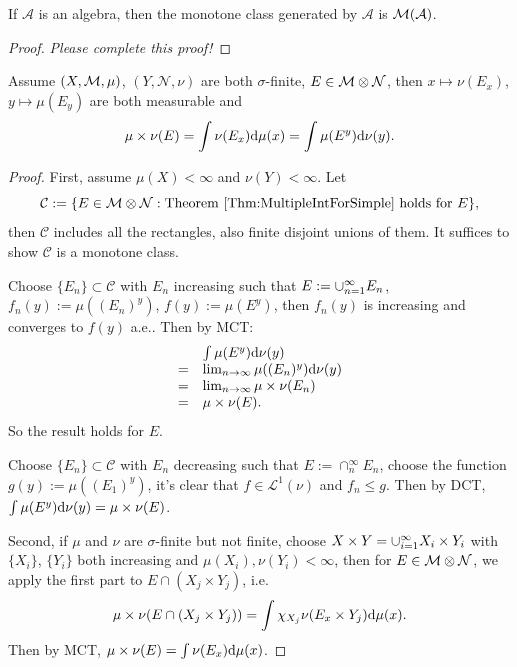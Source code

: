 \begin{lem}
    \label{Lem:MonotoneClassLemma}
    If $\mathcal{A}$ is an algebra, then the monotone class 
    generated by $\mathcal{A}$ is $\mathcal{M}(\mathcal{A})$.
\end{lem}
\begin{proof}
    \textit{Please complete this proof!}
\end{proof}
\begin{thm}
    \label{Thm:MultipleIntForSimple}
    Assume $(X,\mathcal{M},\mu)$, $(Y,\mathcal{N},\nu)$ are both $\sigma$-finite, 
    $E\in\mathcal{M}\otimes\mathcal{N}$, then $x\mapsto\nu(E_x)$, 
    $y\mapsto\mu(E_y)$ are both measurable and 
    \begin{displaymath}
        \mu\times\nu(E)=\int\nu(E_x)\mathrm{d}\mu(x)=\int\mu(E^{y})\mathrm{d}\nu(y).
    \end{displaymath}
\end{thm}
\begin{proof}
    First, assume $\mu(X)<\infty$ and 
    $\nu(Y)<\infty$. Let 
    \begin{displaymath}
        \mathcal{C}:=\{E\in\mathcal{M}\otimes\mathcal{N}:
        \text{Theorem \ref{Thm:MultipleIntForSimple} holds for }E\},
    \end{displaymath}
    then $\mathcal{C}$ includes all the rectangles, also finite disjoint 
    unions of them. It suffices to show $\mathcal{C}$ is a monotone 
    class. 

    Choose $\{E_{n}\}\subset\mathcal{C}$ with $E_{n}$ increasing 
    such that $E:=\cup_{n=1}^{\infty}E_{n}$, $f_{n}(y):=\mu((E_{n})^{y})$, 
    $f(y):=\mu(E^{y})$, then $f_{n}(y)$ is increasing and converges 
    to $f(y)$ a.e.. Then by MCT:
    \begin{displaymath}
        \begin{array}{rl}
        &\int\mu(E^{y})\mathrm{d}\nu(y)\\
        =&\lim_{n\rightarrow\infty}
        \mu((E_{n})^{y})\mathrm{d}\nu(y)\\
        =&\lim_{n\rightarrow\infty}\mu\times\nu(E_{n})\\
        =&\mu\times\nu(E).
        \end{array}
    \end{displaymath}
    So the result holds for $E$. 
    
    Choose $\{E_{n}\}\subset\mathcal{C}$ with $E_{n}$ decreasing 
    such that $E:=\cap_{n}^{\infty}E_{n}$, choose the 
    function $g(y):=\mu((E_{1})^{y})$, it's clear that 
    $f\in\mathcal{L}^{1}(\nu)$ and $f_{n}\le g$. Then by DCT, 
    $\int\mu(E^{y})\mathrm{d}\nu(y)=\mu\times\nu(E)$.

    Second, if $\mu$ and $\nu$ are $\sigma$-finite but not finite, 
    choose $X\times Y=\cup_{i=1}^{\infty}X_{i}\times Y_{i}$ 
    with $\{X_{i}\}$, $\{Y_{i}\}$ both increasing and 
    $\mu(X_{i}),\nu(Y_{i})<\infty$, then for $E\in\mathcal{M}\otimes\mathcal{N}$, 
    we apply the first part to $E\cap (X_{j}\times Y_{j})$, 
    i.e. 
    \begin{displaymath}
        \mu\times\nu(E\cap(X_{j}\times Y_{j}))
        =\int\chi_{X_{j}}\nu(E_{x}\times Y_{j})\mathrm{d}\mu(x).
    \end{displaymath}
    Then by MCT, $\mu\times\nu(E)=\int\nu(E_{x})\mathrm{d}\mu(x)$.
\end{proof}
